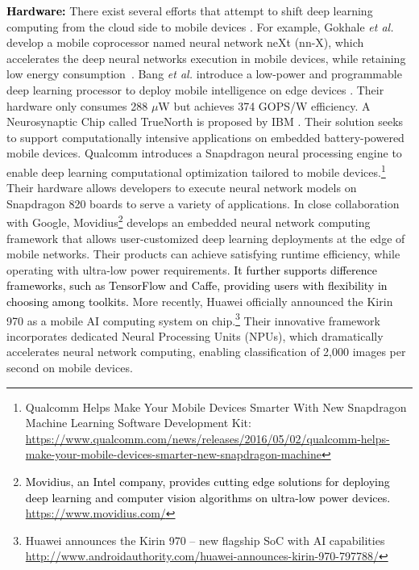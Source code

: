 \documentclass[journal,comsoc,letter]{IEEEtran}
\newcommand{\edit}[1]{\textcolor{black}{#1}}
\newcommand{\rev}[1]{\textcolor{black}{#1}}
\begin{document}
\edit{\textbf{Hardware:}} There exist several efforts that attempt to shift deep learning computing from the cloud side to mobile devices \cite{sze2017efficient}.  For example, Gokhale \emph{et al.} develop a mobile coprocessor named neural network neXt (nn-X), which accelerates the deep neural networks execution in mobile devices, while retaining low energy consumption~\cite{gokhale2014240}. Bang \emph{et al.} introduce a low-power and programmable deep learning processor to deploy mobile intelligence on edge devices \cite{bang201714}. Their hardware only consumes 288 $\mu$W  but  achieves  374 GOPS/W efficiency. A Neurosynaptic Chip called TrueNorth is proposed by IBM \cite{akopyan2016design}. Their solution seeks to support computationally intensive applications on embedded battery-powered mobile devices. Qualcomm introduces a Snapdragon neural processing engine to enable deep learning computational optimization tailored to mobile devices.\footnote{Qualcomm Helps Make Your Mobile Devices Smarter With New Snapdragon Machine Learning Software Development Kit: \url{https://www.qualcomm.com/news/releases/2016/05/02/qualcomm-helps-make-your-mobile-devices-smarter-new-snapdragon-machine}} Their hardware allows developers to execute neural network models on Snapdragon 820 boards to serve a variety of applications. In close collaboration with Google, Movidius\footnote{\rev{Movidius, an Intel company, provides cutting edge solutions for deploying deep learning and computer vision algorithms on ultra-low power devices. \url{https://www.movidius.com/}}} develops an embedded neural network computing framework that allows user-customized deep learning deployments at the edge of mobile networks. Their products can achieve satisfying runtime efficiency, while operating with ultra-low power requirements. \rev{It further supports difference frameworks, such as TensorFlow and Caffe, providing users with flexibility in choosing among toolkits.} More recently, Huawei officially announced the Kirin 970 as a mobile AI computing system on chip.\footnote{Huawei announces the {Kirin} 970 -- new flagship {SoC} with {AI} capabilities \url{http://www.androidauthority.com/huawei-announces-kirin-970-797788/}} Their innovative framework incorporates dedicated Neural Processing Units (NPUs), which dramatically accelerates neural network computing, enabling classification of 2,000 images per second on mobile devices. 
\end{document}
